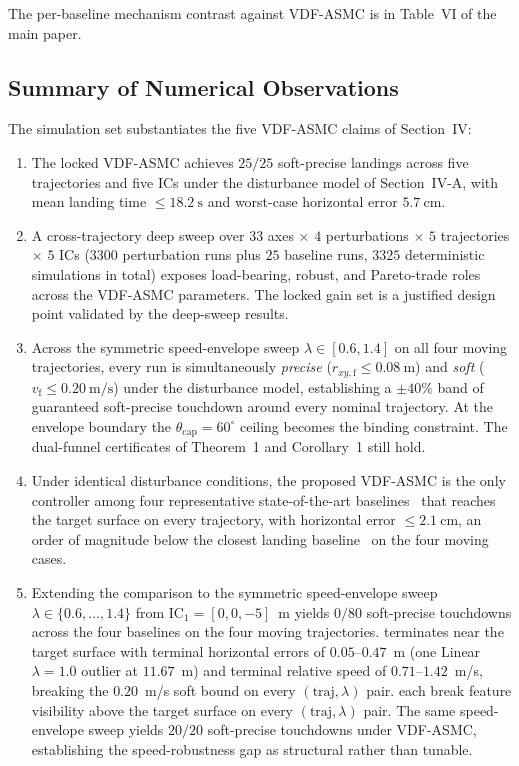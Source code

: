 \documentclass[10pt,journal]{IEEEtran}
\begin{document}
The per-baseline mechanism contrast against VDF-ASMC is in Table~VI of the main paper.

\subsection{Summary of Numerical Observations}
\label{sec:sup-summary}
The simulation set substantiates the five VDF-ASMC claims of Section~IV:
\begin{enumerate}
    \item The locked VDF-ASMC achieves $25/25$ soft-precise landings across five trajectories and five ICs under the disturbance model of Section~IV-A, with mean landing time $\le 18.2~\text{s}$ and worst-case horizontal error $5.7~\text{cm}$.
    \item A cross-trajectory deep sweep over $33$ axes $\times$ $4$ perturbations $\times$ $5$ trajectories $\times$ $5$ ICs ($3300$ perturbation runs plus $25$ baseline runs, $3325$ deterministic simulations in total) exposes load-bearing, robust, and Pareto-trade roles across the VDF-ASMC parameters. The locked gain set is a justified design point validated by the deep-sweep results.
    \item Across the symmetric speed-envelope sweep $\lambda\in[0.6,1.4]$ on all four moving trajectories, every run is simultaneously \emph{precise} ($r_{xy,\text{f}}\le 0.08~\text{m}$) and \emph{soft} ($v_\text{f}\le 0.20~\text{m/s}$) under the disturbance model, establishing a $\pm 40\%$ band of guaranteed soft-precise touchdown around every nominal trajectory. At the envelope boundary the $\theta_\text{cap}=60^\circ$ ceiling becomes the binding constraint. The dual-funnel certificates of Theorem~1 and Corollary~1 still hold.
    \item Under identical disturbance conditions, the proposed VDF-ASMC is the only controller among four representative state-of-the-art baselines~\cite{lin2022,zhang2026,lin2023,cho2022} that reaches the target surface on every trajectory, with horizontal error $\le 2.1~\text{cm}$, an order of magnitude below the closest landing baseline~\cite{zhang2026} on the four moving cases.
    \item Extending the comparison to the symmetric speed-envelope sweep $\lambda\in\{0.6,\ldots,1.4\}$ from IC$_1=[0,0,-5]$~m yields $0/80$ soft-precise touchdowns across the four baselines on the four moving trajectories. \cite{zhang2026} terminates near the target surface with terminal horizontal errors of $0.05$--$0.47$~m (one Linear $\lambda{=}1.0$ outlier at $11.67$~m) and terminal relative speed of $0.71$--$1.42$~m/s, breaking the $0.20$~m/s soft bound on every $(\text{traj},\lambda)$ pair. \cite{lin2022,lin2023,cho2022} each break feature visibility above the target surface on every $(\text{traj},\lambda)$ pair. The same speed-envelope sweep yields $20/20$ soft-precise touchdowns under VDF-ASMC, establishing the speed-robustness gap as structural rather than tunable.
\end{enumerate}


\end{document}
